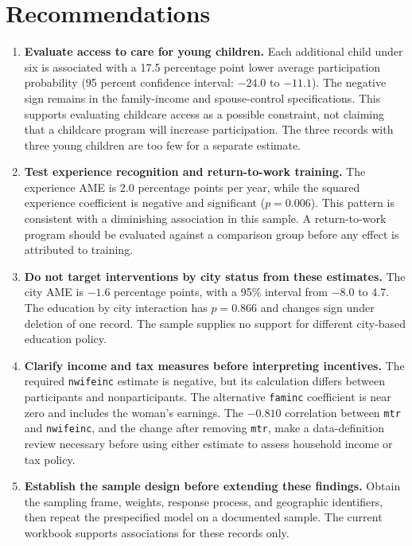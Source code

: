 \documentclass[conference]{IEEEtran}
\begin{document}
\section{Recommendations}
\begin{enumerate}
\item \textbf{Evaluate access to care for young children.} Each additional child under six is associated with a 17.5 percentage point lower average participation probability (95 percent confidence interval: $-24.0$ to $-11.1$). The negative sign remains in the family-income and spouse-control specifications. This supports evaluating childcare access as a possible constraint, not claiming that a childcare program will increase participation. The three records with three young children are too few for a separate estimate.
\item \textbf{Test experience recognition and return-to-work training.} The experience AME is 2.0 percentage points per year, while the squared experience coefficient is negative and significant ($p=0.006$). This pattern is consistent with a diminishing association in this sample. A return-to-work program should be evaluated against a comparison group before any effect is attributed to training.
\item \textbf{Do not target interventions by city status from these estimates.} The city AME is $-1.6$ percentage points, with a 95\% interval from $-8.0$ to 4.7. The education by city interaction has $p=0.866$ and changes sign under deletion of one record. The sample supplies no support for different city-based education policy.
\item \textbf{Clarify income and tax measures before interpreting incentives.} The required \texttt{nwifeinc} estimate is negative, but its calculation differs between participants and nonparticipants. The alternative \texttt{faminc} coefficient is near zero and includes the woman's earnings. The $-0.810$ correlation between \texttt{mtr} and \texttt{nwifeinc}, and the change after removing \texttt{mtr}, make a data-definition review necessary before using either estimate to assess household income or tax policy.
\item \textbf{Establish the sample design before extending these findings.} Obtain the sampling frame, weights, response process, and geographic identifiers, then repeat the prespecified model on a documented sample. The current workbook supports associations for these records only.
\end{enumerate}
\end{document}
